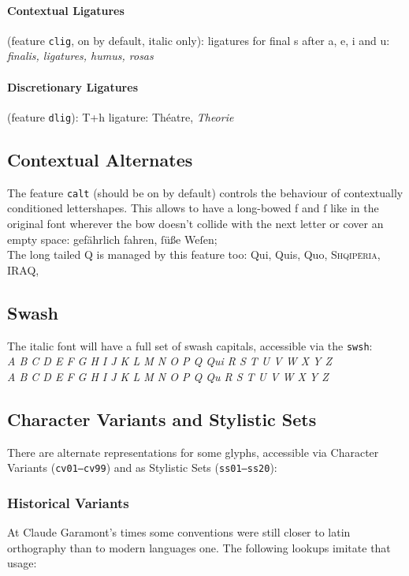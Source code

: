 \documentclass[pagesize,DIV14]{scrartcl}
\begin{document}
\paragraph*{Contextual Ligatures} (feature \texttt{clig}, on by default, italic only): ligatures for final s after a, e, i and u: \textit{%
finalis, ligatures, humus, rosas}
\paragraph*{Discretionary Ligatures} (feature \texttt{dlig}): T+h ligature:  Théatre, \textit{Theorie}

\subsection{Contextual Alternates}
The feature \texttt{calt} (should be on by default) controls the behaviour of contextually conditioned lettershapes. This allows to have a long-bowed f and ſ like in the original font wherever the bow doesn’t collide with the next letter or cover an empty space: gefährlich fahren, ſüße Weſen;\\
The long tailed Q is managed by this feature too: Qui, Quis, Quo, \textsc{Shqipëria}, IRAQ, 

\subsection{Swash}
The italic font will have a full set of swash capitals, accessible via the \texttt{swsh}: \\\textit{A B C D E F G H I J K L M N O P Q Qui R S T U V W X Y Z\\
\scriptsize A B C D E F G H I J K L M N O P Q Qu R S T U V W X Y Z}
\subsection{Character Variants and Stylistic Sets}
There are alternate representations for some glyphs, accessible via Character Variants (\texttt{cv01–cv99}) and as Stylistic Sets (\texttt{ss01–ss20}):

\subsubsection{Historical Variants}

At Claude Garamont’s times some conventions were still closer to latin orthography than to modern languages one. The following lookups imitate that usage:
\end{document}
